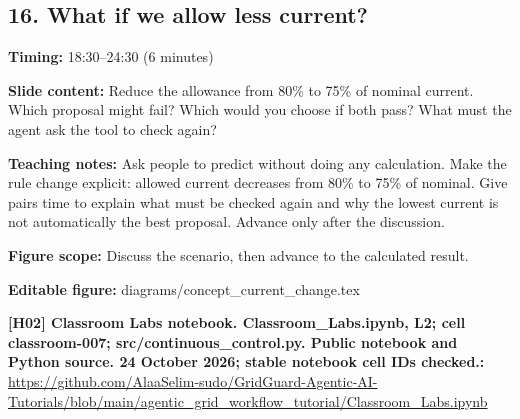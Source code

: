 \documentclass[10pt,letterpaper]{article}
\begin{document}
\subsection*{16. What if we allow less current?}
\textbf{Timing:} 18:30--24:30 (6 minutes)\par
\textbf{Slide content:} Reduce the allowance from 80\% to 75\% of nominal current.
Which proposal might fail? Which would you choose if both pass?
What must the agent ask the tool to check again?\par
\textbf{Teaching notes:} Ask people to predict without doing any calculation. Make the rule change explicit: allowed current decreases from 80\% to 75\% of nominal. Give pairs time to explain what must be checked again and why the lowest current is not automatically the best proposal. Advance only after the discussion.\par
\textbf{Figure scope:} Discuss the scenario, then advance to the calculated result.\par
\textbf{Editable figure:} diagrams/concept\_current\_change.tex\par
\textbf{[H02] Classroom Labs notebook. Classroom\_Labs.ipynb, L2; cell classroom-007; src/continuous\_control.py. Public notebook and Python source. 24 October 2026; stable notebook cell IDs checked.:} \href{https://github.com/AlaaSelim-sudo/GridGuard-Agentic-AI-Tutorials/blob/main/agentic_grid_workflow_tutorial/Classroom_Labs.ipynb}{\small\ttfamily https:/\allowbreak{}/\allowbreak{}github.\allowbreak{}com/\allowbreak{}AlaaSelim-\allowbreak{}sudo/\allowbreak{}GridGuard-\allowbreak{}Agentic-\allowbreak{}AI-\allowbreak{}Tutorials/\allowbreak{}blob/\allowbreak{}main/\allowbreak{}agentic\_\allowbreak{}grid\_\allowbreak{}workflow\_\allowbreak{}tutorial/\allowbreak{}Classroom\_\allowbreak{}Labs.\allowbreak{}ipynb}\par
\par\medskip
\end{document}
